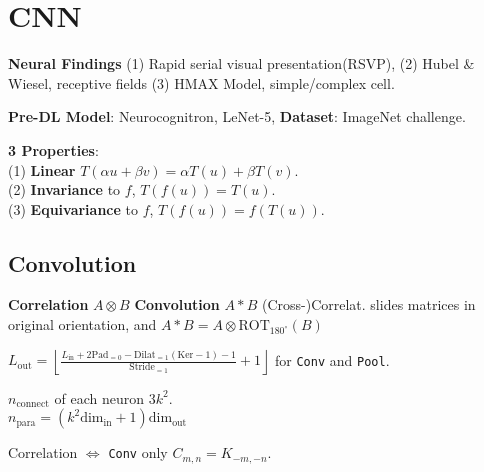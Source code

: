\section{CNN}

\textbf{Neural Findings}
(1) Rapid serial visual presentation(RSVP), (2) Hubel \& Wiesel, receptive fields (3) HMAX Model, simple/complex cell.

\textbf{Pre-DL Model}: Neurocognitron, LeNet-5, \textbf{Dataset}: ImageNet challenge.

\textbf{3 Properties}:\\
(1) \textbf{Linear} \(T(\alpha {u}+\beta {v})=\alpha T({u})+\beta T({v})\).\\ (2) \textbf{Invariance} to \(f\), \(T(f({u}))=T({u})\).\\ (3) \textbf{Equivariance} to \(f\), \(T(f({u}))=f(T({u}))\).

\subsection*{Convolution}
\textbf{Correlation} $A \otimes B$  \textbf{Convolution} $A \ast B$
(Cross-)Correlat. slides matrices in original orientation, and $A \ast B = A \otimes \text{ROT}_{180^{\circ}}(B)$




\( L_{\text{out}}=\left\lfloor \frac{  L_{\text{in}} + 2\text{Pad}_{=0} - \text {Dilat}_{=1}(\text{Ker} - 1)-1 }{\text {Stride}_{=1}} + 1 \right\rfloor \) for \verb|Conv| and \verb|Pool|.

\(n_{\text{connect}}\) of each neuron \(3k^2\).\\
\(n_{\text{para}} = ( k^2 \text{dim}_{\text{in}} + 1)\text{dim}_{\text{out}}\)

Correlation \(\Leftrightarrow\) \verb|Conv| only \(C_{m,n} = K_{-m,-n}\).

